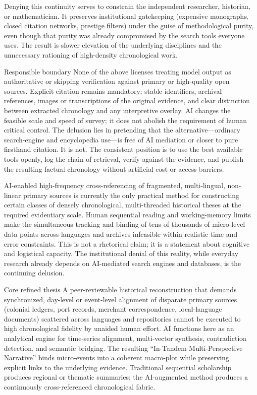 Denying this continuity serves to constrain the independent researcher, historian, or mathematician. It preserves institutional gatekeeping (expensive monographs, closed citation networks, prestige filters) under the guise of methodological purity, even though that purity was already compromised by the search tools everyone uses. The result is slower elevation of the underlying disciplines and the unnecessary rationing of high-density chronological work.

Responsible boundary
None of the above licenses treating model output as authoritative or skipping verification against primary or high-quality open sources. Explicit citation remains mandatory: stable identifiers, archival references, images or transcriptions of the original evidence, and clear distinction between extracted chronology and any interpretive overlay. AI changes the feasible scale and speed of survey; it does not abolish the requirement of human critical control. The delusion lies in pretending that the alternative—ordinary search-engine and encyclopedia use—is free of AI mediation or closer to pure firsthand citation. It is not. The consistent position is to use the best available tools openly, log the chain of retrieval, verify against the evidence, and publish the resulting factual chronology without artificial cost or access barriers.

AI-enabled high-frequency cross-referencing of fragmented, multi-lingual, non-linear primary sources is currently the only practical method for constructing certain classes of densely chronological, multi-threaded historical theses at the required evidentiary scale. Human sequential reading and working-memory limits make the simultaneous tracking and binding of tens of thousands of micro-level data points across languages and archives infeasible within realistic time and error constraints. This is not a rhetorical claim; it is a statement about cognitive and logistical capacity. The institutional denial of this reality, while everyday research already depends on AI-mediated search engines and databases, is the continuing delusion.

Core refined thesis
A peer-reviewable historical reconstruction that demands synchronized, day-level or event-level alignment of disparate primary sources (colonial ledgers, port records, merchant correspondence, local-language documents) scattered across languages and repositories cannot be executed to high chronological fidelity by unaided human effort. AI functions here as an analytical engine for time-series alignment, multi-vector synthesis, contradiction detection, and semantic bridging. The resulting “In-Tandem Multi-Perspective Narrative” binds micro-events into a coherent macro-plot while preserving explicit links to the underlying evidence. Traditional sequential scholarship produces regional or thematic summaries; the AI-augmented method produces a continuously cross-referenced chronological fabric.

